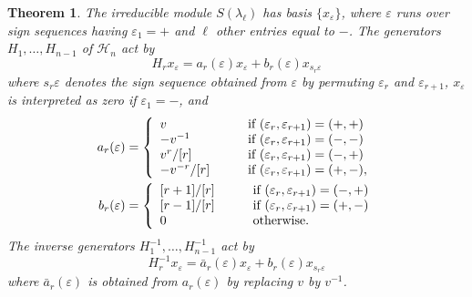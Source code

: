 \documentclass [12pt, letterpaper, oneside] {amsart}
\newcommand \e {\varepsilon}
\renewcommand \l {\lambda}
\newcommand \mc {\mathcal}
\theoremstyle {plain}
\newtheorem {thm} [subsection] {Theorem}
\begin{document}
\begin{thm}\label{signs irrep thm}
The irreducible module $S(\l_\ell)$ has basis $\{x_{\e}\}$, where $\e$ 
runs over sign sequences having $\e_1=+$ and $\ell$ other entries equal to $-$.  The generators $H_1, \ldots, H_{n-1}$ of $\mc{H}_n$ act by
\begin {equation} \label {signs s-n formula}
H_r x_\e = a_r(\e) x_\e + b_r(\e) x_{s_r\e}
\end {equation}
where $s_r \e$ denotes the sign sequence obtained from $\e$ by 
permuting $\e_r$ and $\e_{r+1}$, $x_\e$ is interpreted as zero if $\e_1 = -$, and
\begin {align} \label {diag coeff}
a_r(\e) &= \left\{ \begin {array} {l l}
v &\qquad \text {if } (\e_r, \e_{r+1}) = (+, +) \\
-v^{-1} &\qquad \text {if } (\e_r, \e_{r+1}) = (-, -) \\
v^r / [r] &\qquad \text {if } (\e_r, \e_{r+1}) = (-, +) \\
-v^{-r} / [r] &\qquad \text {if } (\e_r, \e_{r+1}) = (+, -),
\end {array} \right.\\
\label {off-diag coeff}
b_r(\e) &= \left\{ \begin {array} {l l}
{[r+1] / [r]} &\qquad \text {if } (\e_r, \e_{r+1}) = (-, +) \\
{[r-1] / [r]} &\qquad \text {if } (\e_r, \e_{r+1}) = (+, -)\\
0&\qquad \text{otherwise.}
\end {array} \right.
\end {align}
The inverse generators $H_1^{-1}, \ldots, H_{n-1}^{-1}$ act by
\begin {equation} \label {newer}
H_r^{-1} x_\e = \bar a_r(\e) x_\e + b_r(\e) x_{s_r\e}
\end {equation}
where $\bar a_r(\e)$ is obtained from 
$a_r(\e)$ by replacing $v$ by $v^{-1}$.
\end{thm}
\end{document}
